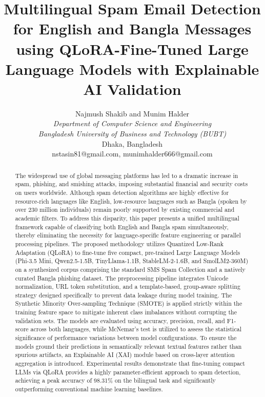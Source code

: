 \documentclass[journal]{IEEEtran}
\begin{document}
\title{Multilingual Spam Email Detection for English and Bangla Messages using QLoRA-Fine-Tuned Large Language Models with Explainable AI Validation}

\author{Najmush Shakib and Munim Halder \\
\textit{Department of Computer Science and Engineering} \\
\textit{Bangladesh University of Business and Technology (BUBT)} \\
Dhaka, Bangladesh \\
nstasin81@gmail.com, munimhalder666@gmail.com
}

\maketitle

\begin{abstract}
The widespread use of global messaging platforms has led to a dramatic increase in spam, phishing, and smishing attacks, imposing substantial financial and security costs on users worldwide. Although spam detection algorithms are highly effective for resource-rich languages like English, low-resource languages such as Bangla (spoken by over 230 million individuals) remain poorly supported by existing commercial and academic filters. To address this disparity, this paper presents a unified multilingual framework capable of classifying both English and Bangla spam simultaneously, thereby eliminating the necessity for language-specific feature engineering or parallel processing pipelines. The proposed methodology utilizes Quantized Low-Rank Adaptation (QLoRA) to fine-tune five compact, pre-trained Large Language Models (Phi-3.5 Mini, Qwen2.5-1.5B, TinyLlama-1.1B, StableLM-2-1.6B, and SmolLM2-360M) on a synthesized corpus comprising the standard SMS Spam Collection and a natively curated Bangla phishing dataset. The preprocessing pipeline integrates Unicode normalization, URL token substitution, and a template-based, group-aware splitting strategy designed specifically to prevent data leakage during model training. The Synthetic Minority Over-sampling Technique (SMOTE) is applied strictly within the training feature space to mitigate inherent class imbalances without corrupting the validation sets. The models are evaluated using accuracy, precision, recall, and F1-score across both languages, while McNemar's test is utilized to assess the statistical significance of performance variations between model configurations. To ensure the models ground their predictions in semantically relevant textual features rather than spurious artifacts, an Explainable AI (XAI) module based on cross-layer attention aggregation is introduced. Experimental results demonstrate that fine-tuning compact LLMs via QLoRA provides a highly parameter-efficient approach to spam detection, achieving a peak accuracy of 98.31\% on the bilingual task and significantly outperforming conventional machine learning baselines.
\end{abstract}
\end{document}
